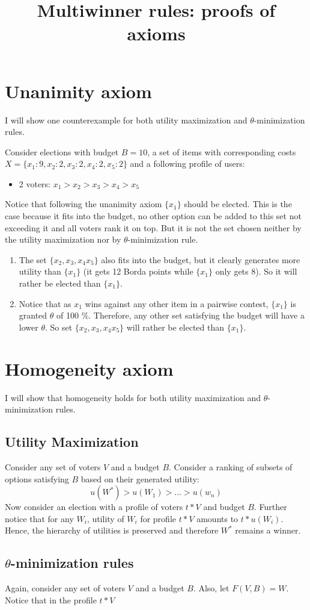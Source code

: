 \documentclass{article}
\title{Multiwinner rules: proofs of axioms}
\begin{document}
\maketitle

\section{Unanimity axiom}
I will show one counterexample for both utility maximization and $\theta$-minimization rules.

Consider elections with budget $B=10$, a set of items with corresponding costs $X= \{x_1:9, x_2:2, x_3:2, x_4:2, x_5:2\}$ and a following profile of users:
\begin{itemize}
\item 2 voters: $x_1 > x_2 >x_3 > x_4 > x_5$
\end{itemize}
 Notice that following the unanimity axiom $\{x_1 \}$ should be elected. This is the case because it fits into the budget, no other option can be added to this set not exceeding it and all voters rank it on top. But it is not the set chosen neither by the utility maximization nor by $\theta$-minimization rule.
 
\begin{enumerate}
\item The set $\{x_2, x_3, x_4 x_5 \}$ also fits into the budget, but it clearly generates more utility than $\{ x_1\}$ (it gets 12 Borda points while $\{ x_1\}$ only gets 8). So it will rather be elected than $\{x_1 \}$. 
\item Notice that as $x_1$ wins against any other item in a pairwise contest, $\{x_1 \}$ is granted $\theta$ of 100 \%. Therefore, any other set satisfying the budget will have a lower $\theta$. So set $\{x_2, x_3, x_4 x_5 \}$ will rather be elected than $\{x_1 \}$.
\end{enumerate}
\section{Homogeneity axiom}
I will show that homogeneity holds for both utility maximization and $\theta$-minimization rules.
\subsection{Utility Maximization}
Consider any set of voters $V$ and a budget $B$. Consider a ranking of subsets of options satisfying $B$ based on their generated utility:
$$ u(W^*) > u(W_1) > \dots > u(w_n)$$
Now consider an election with a profile of voters $t*V$ and budget $B$. Further notice that for any $W_i$, utility of $W_i$ for profile $t*V$ amounts to $t*u(W_i)$. Hence, the hierarchy of utilities is preserved and therefore $W^*$ remains a winner.
\subsection{$\theta$-minimization rules}
Again, consider any set of voters $V$ and a budget $B$. Also, let $F(V, B) = W$. Notice that in the profile $t*V$ 
\end{document}
